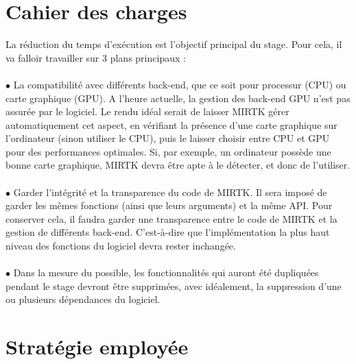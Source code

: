 \documentclass[10pt]{report}
\begin{document}
	\section{Cahier des charges}
	La réduction du temps d'exécution est l'objectif principal du stage. Pour cela, il va falloir travailler sur 3 plans principaux : \\
	\\{$\bullet$} La compatibilité avec différents back-end, que ce soit pour processur (CPU) ou carte graphique (GPU). A l'heure actuelle, la gestion des back-end GPU n'est pas assurée par le logiciel. Le rendu idéal serait de laisser MIRTK gérer automatiquement cet aspect, en vérifiant la présence d'une carte graphique sur l'ordinateur (sinon utiliser le CPU), puis le laisser choisir entre CPU et GPU pour des performances optimales. Si, par exemple, un ordinateur possède une bonne carte graphique, MIRTK devra être apte à le détecter, et donc de l'utiliser.\\
	\\{$\bullet$} Garder l'intégrité et la transparence du code de MIRTK. Il sera imposé de garder les mêmes fonctions (ainsi que leurs arguments) et la même API. Pour conserver cela, il faudra garder une transparence entre le code de MIRTK et la gestion de différents back-end. C'est-à-dire que l'implémentation la plus haut niveau des fonctions du logiciel devra rester inchangée.\\
	\\{$\bullet$} Dans la mesure du possible, les fonctionnalités qui auront été dupliquées pendant le stage devront être supprimées, avec idéalement, la suppression d'une ou plusieurs dépendances du logiciel.
	
	\section{Stratégie employée}
\end{document}
